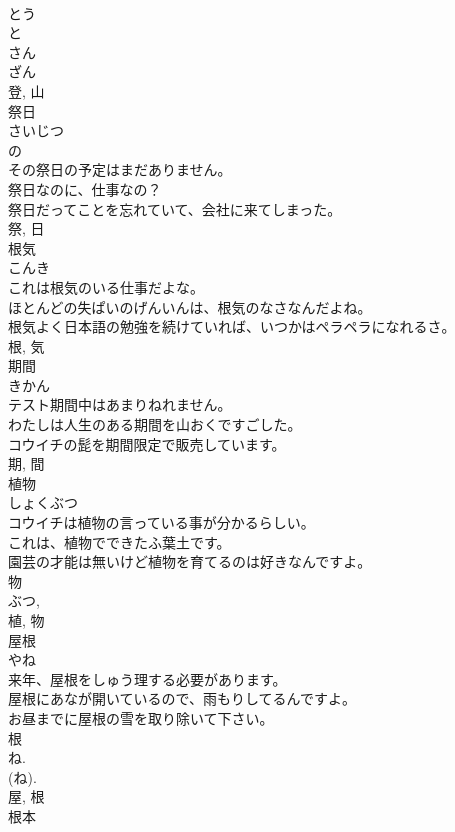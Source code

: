 \documentclass[8pt]{extreport}
\begin{document}
\begin{CJK}{UTF8}{min}
\\	とう 
\\	と 
\\	さん 
\\	ざん 
\\	登, 山	
\\	祭日	
\\	さいじつ	
\\	の 
\\	その祭日の予定はまだありません。	
\\	祭日なのに、仕事なの？	
\\	祭日だってことを忘れていて、会社に来てしまった。	
\\	祭, 日	
\\	根気	
\\	こんき	
\\	これは根気のいる仕事だよな。	
\\	ほとんどの失ぱいのげんいんは、根気のなさなんだよね。	
\\	根気よく日本語の勉強を続けていれば、いつかはペラペラになれるさ。	
\\	根, 気	
\\	期間	
\\	きかん	
\\	テスト期間中はあまりねれません。	
\\	わたしは人生のある期間を山おくですごした。	
\\	コウイチの髭を期間限定で販売しています。	
\\	期, 間	
\\	植物	
\\	しょくぶつ	
\\	コウイチは植物の言っている事が分かるらしい。	
\\	これは、植物でできたふ葉土です。	
\\	園芸の才能は無いけど植物を育てるのは好きなんですよ。	
\\	物 
\\	ぶつ, 
\\	植, 物	
\\	屋根	
\\	やね	
\\	来年、屋根をしゅう理する必要があります。	
\\	屋根にあなが開いているので、雨もりしてるんですよ。	
\\	お昼までに屋根の雪を取り除いて下さい。	
\\	根 
\\	ね. 
\\	(ね). 
\\	屋, 根	
\\	根本	

\end{CJK}
\end{document}
